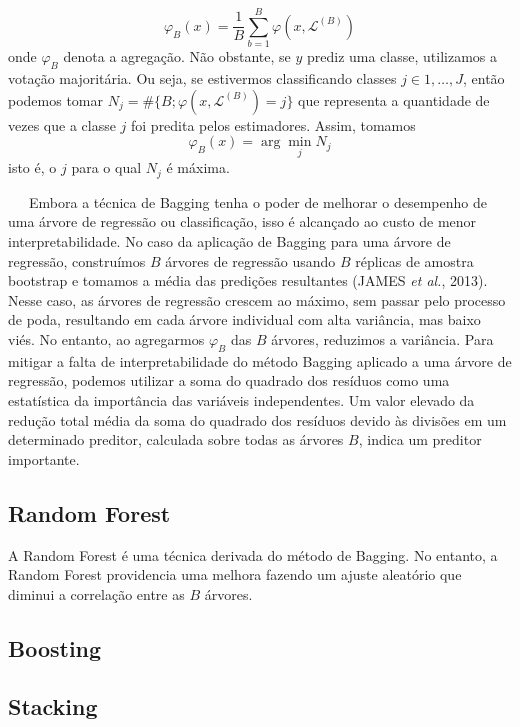 \documentclass[
  12pt,
  letterpaper,
  DIV=11,
  numbers=noendperiod]{scrreprt}
\begin{document}
\[
\varphi_{B}\left(x\right) = \frac{1}{B} \sum_{b = 1}^B \varphi \left(x, \mathcal{L}^{\left(B\right)}\right)
\] onde \(\varphi_{B}\) denota a agregação. Não obstante, se \(y\)
prediz uma classe, utilizamos a votação majoritária. Ou seja, se
estivermos classificando classes \(j \in {1, \dots, J}\), então podemos
tomar
\(N_j = \#\{B; \varphi\left(x, \mathcal{L}^{\left(B\right)}\right) = j\}\)
que representa a quantidade de vezes que a classe \(j\) foi predita
pelos estimadores. Assim, tomamos \[
\varphi_{B}\left(x\right) = \arg \min_{j} N_j
\] isto é, o \(j\) para o qual \(N_j\) é máxima.

\vspace{12pt}

~~~Embora a técnica de Bagging tenha o poder de melhorar o desempenho de
uma árvore de regressão ou classificação, isso é alcançado ao custo de
menor interpretabilidade. No caso da aplicação de Bagging para uma
árvore de regressão, construímos \(B\) árvores de regressão usando \(B\)
réplicas de amostra bootstrap e tomamos a média das predições
resultantes (JAMES \emph{et al.}, 2013). Nesse caso, as árvores de
regressão crescem ao máximo, sem passar pelo processo de poda,
resultando em cada árvore individual com alta variância, mas baixo viés.
No entanto, ao agregarmos \(\varphi_{B}\) das \(B\) árvores, reduzimos a
variância. Para mitigar a falta de interpretabilidade do método Bagging
aplicado a uma árvore de regressão, podemos utilizar a soma do quadrado
dos resíduos como uma estatística da importância das variáveis
independentes. Um valor elevado da redução total média da soma do
quadrado dos resíduos devido às divisões em um determinado preditor,
calculada sobre todas as árvores \(B\), indica um preditor importante.

\subsection{Random Forest}\label{random-forest}

A Random Forest é uma técnica derivada do método de Bagging. No entanto,
a Random Forest providencia uma melhora fazendo um ajuste aleatório que
diminui a correlação entre as \(B\) árvores.

\subsection{Boosting}\label{boosting}

\subsection{Stacking}\label{stacking}
\end{document}
